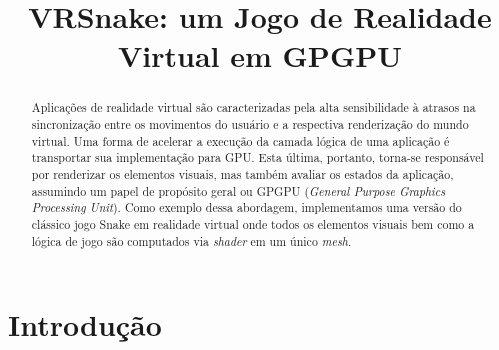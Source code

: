 \documentclass[conference]{IEEEtran}
\begin{document}
\title{VRSnake: um Jogo de Realidade Virtual em GPGPU}



\author{
} 


\maketitle

\begin{abstract}
Aplicações de realidade virtual são caracterizadas pela alta sensibilidade à atrasos na sincronização entre os movimentos do usuário e a respectiva renderização do mundo virtual. Uma forma de acelerar a execução da camada lógica de uma aplicação é transportar sua implementação para GPU. Esta última, portanto, torna-se responsável por renderizar os elementos visuais, mas também avaliar os estados da aplicação, assumindo um papel de propósito geral ou GPGPU (\textit{General Purpose Graphics Processing Unit}). Como exemplo dessa abordagem, implementamos uma versão do clássico jogo Snake em realidade virtual onde todos os elementos visuais bem como a lógica de jogo são computados via \textit{shader} em um único \textit{mesh}.
\end{abstract}


\IEEEpeerreviewmaketitle

\section{Introdução} \label{sec:introduction}
\end{document}

